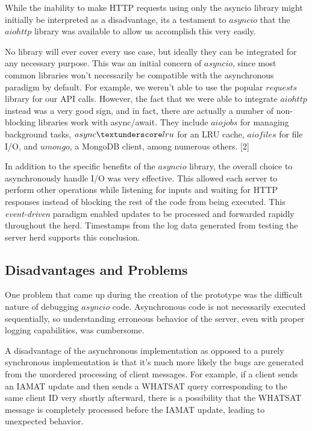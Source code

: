 While the inability to make HTTP requests using only the asyncio library might initially be interpreted as a disadvantage, its 
a testament to $asyncio$ that the $aiohttp$ library was available to allow us accomplish this very easily. 

No library will ever cover every use case, but ideally they can be integrated for any necessary purpose. This was an initial concern of 
$asyncio$, since most common libraries won't necessarily be compatible with the asynchronous paradigm by default. For example, we 
weren't able to use the popular $requests$ library for our API calls. However, the 
fact that we were able to integrate $aiohttp$ instead was a very good sign, and in fact, there are actually a number of non-blocking libraries work with async/await. They include
$aiojobs$ for managing background tasks, $async\textunderscore lru$ for an LRU cache, $aiofiles$ for file I/O, and $umongo$, a MongoDB client, among
numerous others. [2]

In addition to the specific benefits of the $asyncio$ library, the overall choice to asynchronously handle I/O
was very effective. This allowed each server to perform other operations while listening for inputs and waiting for HTTP responses instead 
of blocking the rest of the code from being executed. This \emph{event-driven} paradigm enabled
updates to be processed and forwarded rapidly throughout the herd. Timestamps from the log data generated from testing the server herd supports
this conclusion.

\subsection{Disadvantages and Problems}
One problem that came up during the creation of the prototype was the difficult nature of debugging $asyncio$ code. Asynchronous
code is not necessarily executed sequentially, so understanding erroneous behavior of the server, even with proper logging capabilities, 
was cumbersome.

A disadvantage of the asynchronous implementation as opposed to a purely synchronous implementation is that it's much more likely 
the bugs are generated from the unordered processing of client messages. For example, if a client sends an IAMAT update and then sends a WHATSAT 
query corresponding to the same client ID very shortly afterward, there is a possibility that the WHATSAT message is completely processed before the IAMAT 
update, leading to unexpected behavior. 


